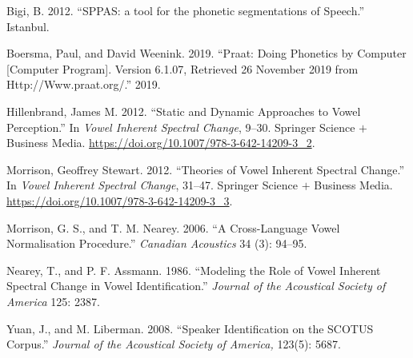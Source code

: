 \documentclass[
  10pt,
]{article}
\newlength{\cslhangindent}
\newenvironment{cslreferences}%
  {\setlength{\parindent}{0pt}%
  \everypar{\setlength{\hangindent}{\cslhangindent}}\ignorespaces}%
  {\par}
\begin{document}
\hypertarget{refs}{}
\begin{cslreferences}
\leavevmode\hypertarget{ref-sppas2012}{}%
Bigi, B. 2012. ``SPPAS: a tool for the phonetic segmentations of Speech.'' Istanbul.

\leavevmode\hypertarget{ref-praat}{}%
Boersma, Paul, and David Weenink. 2019. ``Praat: Doing Phonetics by Computer {[}Computer Program{]}. Version 6.1.07, Retrieved 26 November 2019 from Http://Www.praat.org/.'' 2019.

\leavevmode\hypertarget{ref-hillenbrand2012}{}%
Hillenbrand, James M. 2012. ``Static and Dynamic Approaches to Vowel Perception.'' In \emph{Vowel Inherent Spectral Change}, 9--30. Springer Science \(+\) Business Media. \url{https://doi.org/10.1007/978-3-642-14209-3_2}.

\leavevmode\hypertarget{ref-morrison2012}{}%
Morrison, Geoffrey Stewart. 2012. ``Theories of Vowel Inherent Spectral Change.'' In \emph{Vowel Inherent Spectral Change}, 31--47. Springer Science \(+\) Business Media. \url{https://doi.org/10.1007/978-3-642-14209-3_3}.

\leavevmode\hypertarget{ref-morrison2006}{}%
Morrison, G. S., and T. M. Nearey. 2006. ``A Cross-Language Vowel Normalisation Procedure.'' \emph{Canadian Acoustics} 34 (3): 94--95.

\leavevmode\hypertarget{ref-nearey1986}{}%
Nearey, T., and P. F. Assmann. 1986. ``Modeling the Role of Vowel Inherent Spectral Change in Vowel Identification.'' \emph{Journal of the Acoustical Society of America} 125: 2387.

\leavevmode\hypertarget{ref-p2fa}{}%
Yuan, J., and M. Liberman. 2008. ``Speaker Identification on the SCOTUS Corpus.'' \emph{Journal of the Acoustical Society of America,} 123(5): 5687.
\end{cslreferences}
\end{document}
